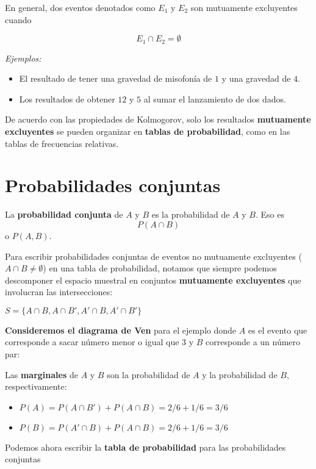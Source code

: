 \documentclass[
]{book}
\providecommand{\tightlist}{%
  \setlength{\itemsep}{0pt}\setlength{\parskip}{0pt}}
\begin{document}
En general, dos eventos denotados como \(E_1\) y \(E_2\) son mutuamente excluyentes cuando

\[E_1\cap E_2=\emptyset\]

\emph{Ejemplos:}

\begin{itemize}
\item
  El resultado de tener una gravedad de misofonía de \(1\) y una gravedad de \(4\).
\item
  Los resultados de obtener \(12\) y \(5\) al sumar el lanzamiento de dos dados.
\end{itemize}

De acuerdo con las propiedades de Kolmogorov, solo los resultados \textbf{mutuamente excluyentes} se pueden organizar en \textbf{tablas de probabilidad}, como en las tablas de frecuencias relativas.

\hypertarget{probabilidades-conjuntas}{%
\section{Probabilidades conjuntas}\label{probabilidades-conjuntas}}

La \textbf{probabilidad conjunta} de \(A\) y \(B\) es la probabilidad de \(A\) y \(B\). Eso es \[P(A \cap B)\] o \(P(A,B)\).

Para escribir probabilidades conjuntas de eventos no mutuamente excluyentes (\(A \cap B \neq \emptyset\)) en una tabla de probabilidad, notamos que siempre podemos descomponer el espacio muestral en conjuntos \textbf{mutuamente excluyentes} que involucran las intersecciones:

\(S=\{A\cap B, A \cap B', A'\cap B, A'\cap B'\}\)

\textbf{Consideremos el diagrama de Ven} para el ejemplo donde \(A\) es el evento que corresponde a sacar número menor o igual que 3 y \(B\) corresponde a un número par:

Las \textbf{marginales} de \(A\) y \(B\) son la probabilidad de \(A\) y la probabilidad de \(B\), respectivamente:

\begin{itemize}
\tightlist
\item
  \(P(A)=P(A\cap B') + P(A \cap B)=2/6+1/6=3/6\)
\item
  \(P(B)=P(A'\cap B) +P(A \cap B)=2/6+1/6=3/6\)
\end{itemize}

Podemos ahora escribir la \textbf{tabla de probabilidad} para las probabilidades conjuntas
\end{document}
